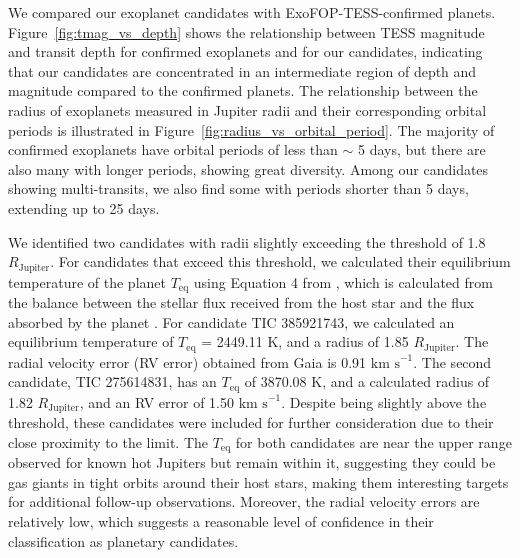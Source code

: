 
We compared our exoplanet candidates with ExoFOP-TESS-confirmed planets. Figure~\ref{fig:tmag_vs_depth} shows the relationship between TESS magnitude and transit depth for confirmed exoplanets and for our candidates, indicating that our candidates are concentrated in an intermediate region of depth and magnitude compared to the confirmed planets. The relationship between the radius of exoplanets measured in Jupiter radii and their corresponding orbital periods is illustrated in Figure~\ref{fig:radius_vs_orbital_period}. The majority of confirmed exoplanets have orbital periods of less than $\sim$ 5 days, but there are also many with longer periods, showing great diversity. Among our candidates showing multi-transits, we also find some with periods shorter than 5 days, extending up to 25 days. \par


We identified two candidates with radii slightly exceeding the threshold of 1.8 $R_{\mathrm{Jupiter}}$. For candidates that exceed this threshold, we calculated their equilibrium temperature of the planet $T_{\mathrm{eq}}$ using Equation 4 from \cite{mendez2017equilibrium}, which is calculated from the balance between the stellar flux received from the host star and the flux absorbed by the planet \citep{selsis2007habitable}. For candidate TIC 385921743, we calculated an equilibrium temperature of $T_{\mathrm{eq}}$ = 2449.11 $\mathrm{K}$, and a radius of 1.85 $R_{\mathrm{Jupiter}}$. The radial velocity error (RV error) obtained from Gaia is 0.91 $\text{km s}^{-1}$. The second candidate, TIC 275614831, has an $T_{\mathrm{eq}}$ of 3870.08 $\mathrm{K}$, and a calculated radius of 1.82 $R_{\mathrm{Jupiter}}$, and an RV error of 1.50 $\text{km s}^{-1}$. 
Despite being slightly above the threshold, these candidates were included for further consideration due to their close proximity to the limit. The $T_{\mathrm{eq}}$ for both candidates are near the upper range observed for known hot Jupiters but remain within it, suggesting they could be gas giants in tight orbits around their host stars, making them interesting targets for additional follow-up observations. Moreover, the radial velocity errors are relatively low, which suggests a reasonable level of confidence in their classification as planetary candidates.


